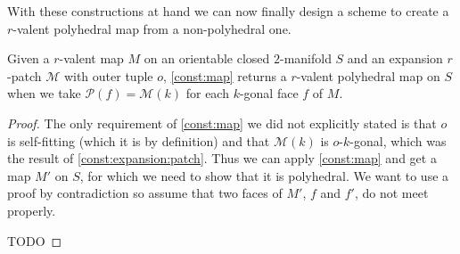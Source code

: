 With these constructions at hand we can now finally design a scheme to create a $r$-valent polyhedral map from a non-polyhedral one.

\begin{theorem}\label{thm:const:polymap}
  Given a $r$-valent map $M$ on an orientable closed $2$-manifold $S$ and an expansion $r$-patch $\mathcal{M}$ with outer tuple $o$, \autoref{const:map} returns a $r$-valent polyhedral map on $S$ when we take $\mathcal{P}(f) = \mathcal{M}(k)$ for each $k$-gonal face $f$ of $M$.
\begin{proof}
The only requirement of \autoref{const:map} we did not explicitly stated is that $o$ is self-fitting (which it is by definition) and that $\mathcal{M}(k)$ is $o$-$k$-gonal, which was the result of \autoref{const:expansion:patch}. Thus we can apply \autoref{const:map} and get a map $M'$ on $S$, for which we need to show that it is polyhedral. We want to use a proof by contradiction so assume that two faces of $M'$, $f$ and $f'$, do not meet properly.

TODO
\end{proof}
\end{theorem}



